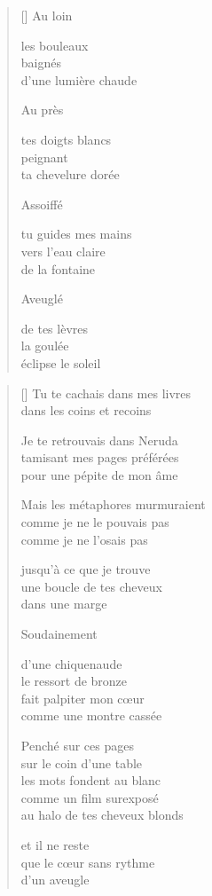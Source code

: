 \documentclass[12pt,a4paper]{article}
\begin{document}
\begin{verse}[\versewidth]
  Au loin

  les bouleaux \\
  baignés \\
  d'une lumière chaude

  Au près

  tes doigts blancs \\
  peignant \\
  ta chevelure dorée

  Assoiffé

  tu guides mes mains \\
  vers l'eau claire \\
  de la fontaine

  Aveuglé

  de tes lèvres \\
  la goulée \\
  éclipse le soleil
\end{verse}


\newpage

\poemtitle{}

\settowidth{\versewidth}{Mais les métaphores murmuraient}

\bigskip

\begin{verse}[\versewidth]
  Tu te cachais dans mes livres \\
  dans les coins et recoins

  Je te retrouvais dans Neruda \\
  tamisant mes pages préférées \\
  pour une pépite de mon âme

  Mais les métaphores murmuraient \\
  comme je ne le pouvais pas \\
  comme je ne l'osais pas

  jusqu'à ce que je trouve \\
  une boucle de tes cheveux \\
  dans une marge

  Soudainement

  d'une chiquenaude \\
  le ressort de bronze \\
  fait palpiter mon cœur \\
  comme une montre cassée

  Penché sur ces pages \\
  sur le coin d'une table \\
  les mots fondent au blanc \\
  comme un film surexposé \\
  au halo de tes cheveux blonds

  et il ne reste \\
  que le cœur sans rythme \\
  d'un aveugle
\end{verse}
\end{document}
